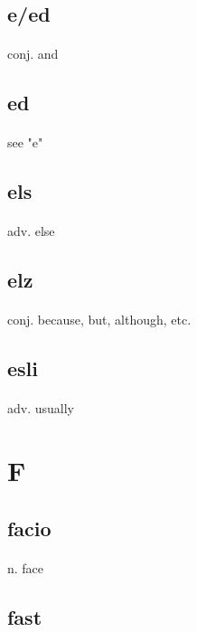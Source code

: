 \documentclass[UTF8]{article}
\begin{document}
    \subsection{e/ed}
    \paragraph{} conj. and 
    \subsection{ed}
    \paragraph{} see "e" 
    \subsection{els}
    \paragraph{} adv. else 
    \subsection{elz}
    \paragraph{} conj. because, but, although, etc. 
    \subsection{esli}
    \paragraph{} adv. usually 
    \newpage \section{F}
    \subsection{facio}
    \paragraph{} n. face 
    \subsection{fast}
\end{document}
